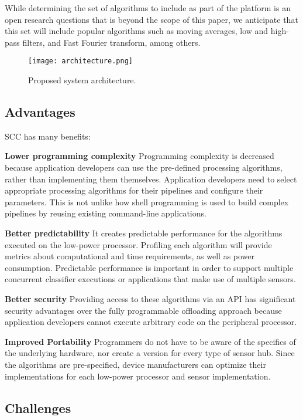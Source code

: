 While determining the set of algorithms to include as part 
of the platform is an open research questions that is beyond the scope 
of this paper, we anticipate that this set will include popular 
algorithms such as moving averages, low and high-pass filters, and Fast 
Fourier transform, among others.


\begin{figure}[t]
	\texttt{[image: architecture.png]}
	\caption{Proposed system architecture.}
    \label{fig:architecture}
\end{figure}

\subsection{Advantages}

SCC has many benefits:

 {\bf Lower programming complexity}  Programming complexity is
  decreased because application developers can use the pre-defined
  processing algorithms, rather than implementing them themselves. 
  Application developers need to select appropriate processing 
  algorithms for their pipelines and configure their parameters. This 
  is not unlike how shell programming is used to build complex 
  pipelines by reusing existing command-line applications.
  

{\bf Better predictability} It 
  creates predictable performance for the algorithms executed on the
  low-power processor. Profiling each algorithm will provide metrics
  about computational and time requirements, as well as power
  consumption.  Predictable performance is important in order to
  support multiple concurrent classifier executions or applications
  that make use of multiple sensors.


{\bf Better security} Providing access to these algorithms via
  an API has significant security advantages over the fully
  programmable offloading approach because application developers
  cannot execute arbitrary code on the peripheral processor. 


{\bf Improved Portability} Programmers do not have to be
  aware of the specifics of the underlying hardware, nor create a version
  for every type of sensor hub. Since the algorithms are
  pre-specified, device manufacturers can optimize their
  implementations for each low-power processor and sensor
  implementation.



\subsection{Challenges}
\label{sec:challenges}

